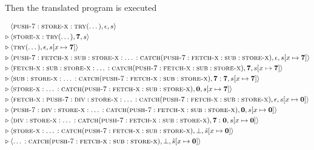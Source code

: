 \documentclass[11pt,oneside,a4paper]{article}
\newcommand{\AMIns}[1]{\textsc{#1}}
\newcommand{\AMConf}[3]{\langle #1, #2, #3 \rangle}
\newcommand{\tdots}{\text{\dots}}
\newcommand{\smap}[2]{[#1 \mapsto \textbf{#2}]}
\begin{document}
Then the translated program is executed

\begin{align*}
&\AMConf{\AMIns{push-7}:\AMIns{store-x}:\AMIns{try}(\tdots)}{\epsilon}{s}
\\
\triangleright \: &\AMConf{\AMIns{store-x}:\AMIns{try}(\tdots)}{\textbf{7}}{s}
\\
\triangleright \: &\AMConf{\AMIns{try}(\tdots)}{\epsilon} {s\smap{x}{7}} \\
\triangleright \: &
\AMConf{\AMIns{push-7}:\AMIns{fetch-x}:\AMIns{sub}:\AMIns{store-x}:
        \tdots:\AMIns{catch}(\AMIns{push-7}:\AMIns{fetch-x}:\AMIns{sub}:
                             \AMIns{store-x})}{\epsilon}{s\smap{x}{7}} \\
\triangleright \: &
\AMConf{\AMIns{fetch-x}:\AMIns{sub}:\AMIns{store-x}:
        \tdots:\AMIns{catch}(\AMIns{push-7}:\AMIns{fetch-x}:\AMIns{sub}:
                             \AMIns{store-x})}{\textbf{7}}{s\smap{x}{7}} \\
\triangleright \: &
\AMConf{\AMIns{sub}:\AMIns{store-x}:
        \tdots:\AMIns{catch}(\AMIns{push-7}:\AMIns{fetch-x}:\AMIns{sub}:
                             \AMIns{store-x})}{\textbf{7}:\textbf{7}}{s\smap{x}{7}} \\
\triangleright \: &
\AMConf{\AMIns{store-x}:
        \tdots:\AMIns{catch}(\AMIns{push-7}:\AMIns{fetch-x}:\AMIns{sub}:
                             \AMIns{store-x})}{\textbf{0}}{s\smap{x}{7}} \\
\triangleright \: &
\AMConf{\AMIns{fetch-x}:\AMIns{push-7}:\AMIns{div}:\AMIns{store-x}:
\tdots:\AMIns{catch}(\AMIns{push-7}:\AMIns{fetch-x}:\AMIns{sub}:
                             \AMIns{store-x})}{\epsilon}{s\smap{x}{0}} \\
\triangleright \: &
\AMConf{\AMIns{push-7}:\AMIns{div}:\AMIns{store-x}:
\tdots:\AMIns{catch}(\AMIns{push-7}:\AMIns{fetch-x}:\AMIns{sub}:
                     \AMIns{store-x})}{\textbf{0}}{s\smap{x}{0}} \\
\triangleright \: &
\AMConf{\AMIns{div}:\AMIns{store-x}:
\tdots:\AMIns{catch}(\AMIns{push-7}:\AMIns{fetch-x}:\AMIns{sub}:
                     \AMIns{store-x})}{\textbf{7}:\textbf{0}}{s\smap{x}{0}} \\
\triangleright \: &
\AMConf{\AMIns{store-x}:
\tdots:\AMIns{catch}(\AMIns{push-7}:\AMIns{fetch-x}:\AMIns{sub}:
                     \AMIns{store-x})}{\bot}{\hat{s}\smap{x}{0}} \\
\triangleright \: &
\AMConf{\tdots:\AMIns{catch}(\AMIns{push-7}:\AMIns{fetch-x}:\AMIns{sub}:
                     \AMIns{store-x})}{\bot}{\hat{s}\smap{x}{0}} \\

\end{align*}
\end{document}
